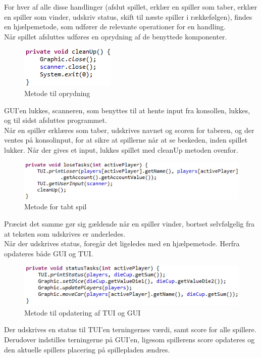 For hver af alle disse handlinger (afslut spillet, erklær en spiller som taber, erklær en spiller som vinder, udskriv status, skift til næste spiller i rækkefølgen), findes en hjælpemetode, som udfører de relevante operationer for en handling.
\\

Når spillet afsluttes udføres en oprydning af de benyttede komponenter.
\begin{figure}[!ht]
\centering
\includegraphics[scale=0.4]{Game-illustration3.jpg}
\caption[<Text for the list of figures>]{Metode til oprydning}
\label{fig:figure 2} 
\end{figure}
GUI’en lukkes, scanneren, som benyttes til at hente input fra konsollen, lukkes, og til sidst afsluttes programmet.
\\

Når en spiller erklæres som taber, udskrives navnet og scoren for taberen, og der ventes på konsolinput, for at sikre at spillerne når at se beskeden, inden spillet lukker. Når der gives et input, lukkes spillet med cleanUp metoden ovenfor.
\begin{figure}[!ht]
\centering
\includegraphics[scale=0.4]{Game-illustration4.jpg}
\caption[<Text for the list of figures>]{Metode for tabt spil}
\label{fig:figure 2} 
\end{figure}
Præcist det samme gør sig gældende når en spiller vinder, bortset selvfølgelig fra at teksten som udskrives er anderledes.
\\

Når der udskrives status, foregår det ligeledes med en hjælpemetode. Herfra opdateres både GUI og TUI.
\begin{figure}[!ht]
\centering
\includegraphics[scale=0.4]{Game-illustration5.jpg}
\caption[<Text for the list of figures>]{Metode til opdatering af TUI og GUI}
\label{fig:figure 2} 
\end{figure}
Der udskrives en status til TUI’en terningernes værdi, samt score for alle spillere. Derudover indstilles terningerne på GUI’en, ligesom spillerens score opdateres og den aktuelle spillers placering på spillepladen ændres.
\\

